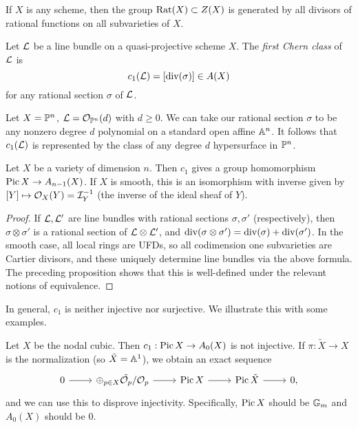 \documentclass{article}
\begin{document}
\begin{prop}
	If $X$ is any scheme, then the group $\Rat(X) \subset Z(X)$ is generated by all divisors of rational functions on all subvarieties of $X$.
\end{prop}

\begin{dfn}
	Let $\Lc$ be a line bundle on a quasi-projective scheme $X$.
	The \emph{first Chern class} of $\Lc$ is
	\[
		c_1(\Lc) = [\divop(\sigma)] \in A(X)
	\]
	for any rational section $\sigma$ of $\Lc$.
\end{dfn}

\begin{ex}
	Let $X = \PP^n$, $\Lc = \Oc_{\PP^n}(d)$ with $d \geq 0$.
	We can take our rational section $\sigma$ to be any nonzero degree $d$ polynomial on a standard open affine $\AA^n$.
	It follows that $c_1(\Lc)$ is represented by the class of any degree $d$ hypersurface in $\PP^n$.
\end{ex}

\begin{prop}
	Let $X$ be a variety of dimension $n$.
	Then $c_1$ gives a group homomorphism $\Pic X \to A_{n-1}(X)$.
	If $X$ is smooth, this is an isomorphism with inverse given by $[Y] \mapsto \Oc_X(Y) = \Ic_Y\inv$ (the inverse of the ideal sheaf of $Y$).
\end{prop}

\begin{proof}
	If $\Lc, \Lc'$ are line bundles with rational sections $\sigma, \sigma'$ (respectively), then $\sigma \otimes \sigma'$ is a rational section of $\Lc \otimes \Lc'$, and $\divop(\sigma \otimes \sigma') = \divop(\sigma) + \divop(\sigma')$.
	In the smooth case, all local rings are UFDs, so all codimension one subvarieties are Cartier divisors, and these uniquely determine line bundles via the above formula.
	The preceding proposition shows that this is well-defined under the relevant notions of equivalence.
\end{proof}

In general, $c_1$ is neither injective nor surjective.
We illustrate this with some examples.

\begin{ex}
	Let $X$ be the nodal cubic.
	Then $c_1: \Pic X \to A_0(X)$ is not injective.
	If $\pi: \tilde{X} \to X$ is the normalization (so $\tilde{X} = \AA^1$), we obtain an exact sequence
	\[
		\begin{tikzcd}
			0 \rar & \oplus_{p \in X} \tilde{\Oc_p} / \Oc_p \rar & \Pic X \rar & \Pic \tilde{X} \rar & 0,
		\end{tikzcd}
	\]
	and we can use this to disprove injectivity.
	Specifically, $\Pic X$ should be $\GG_m$ and $A_0(X)$ should be $0$.
\end{ex}
\end{document}
